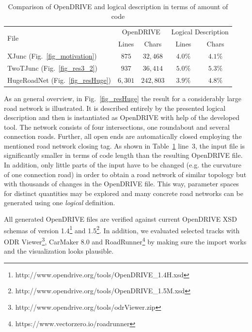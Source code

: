 \documentclass[a4paper, 10pt, conference]{ieeeconf}      %
\begin{document}
\begin{table}[hbt]
	\caption{Comparison of OpenDRIVE and logical description in terms of amount of code}
	\label{tab_comparison}
	\def\arraystretch{1.5}
	\begin{center}
		\begin{tabular}{l|cccc}
			\multirow{2}{*}{File} & \multicolumn{2}{c}{OpenDRIVE} & \multicolumn{2}{c}{Logical Description}\\
			& Lines & Chars & Lines & Chars \\
			\hline
			XJunc (Fig.~\ref{fig_motivation}) & $875$ & $32,468$& $4.0\%$ &$4.1\%$\\
			TwoTJunc (Fig.~\ref{fig_res3_2}) & $937$ & $36,414$& $5.0\%$ &$5.3\%$\\
			HugeRoadNet (Fig.~\ref{fig_resHuge}) & $6,301$ & $242,803$& $3.9\%$ &$4.8\%$
		\end{tabular}
	\end{center}
\end{table}

As an general overview, in Fig.~\ref{fig_resHuge} the result for a considerably large road network is illustrated. It is described entirely by the presented logical description and then is instantiated as OpenDRIVE with help of the developed tool. The network consists of four intersections, one roundabout and several connection roads. Further, all open ends are automatically closed employing the mentioned road network closing tag. As shown in Table~\ref{tab_comparison} line~3, the input file is significantly smaller in terms of code length than the resulting OpenDRIVE file. In addition, only little parts of the input have to be changed (e.g. the curvature of one connection road) in order to obtain a road network of similar topology but with thousands of changes in the OpenDRIVE file. This way, parameter spaces for distinct quantities may be explored and many concrete road networks can be generated using one \emph{logical} definition.


All generated OpenDRIVE files are verified against current OpenDRIVE XSD schemas of version 1.4\footnote{http://www.opendrive.org/tools/OpenDRIVE\_1.4H.xsd} and 1.5\footnote{http://www.opendrive.org/tools/OpenDRIVE\_1.5M.xsd}. In addition, we evaluated selected tracks with ODR Viewer\footnote{http://www.opendrive.org/tools/odrViewer.zip}, CarMaker 8.0 and RoadRunner\footnote{https://www.vectorzero.io/roadrunner} by making sure the import works and the visualization looks plausible.
\end{document}
